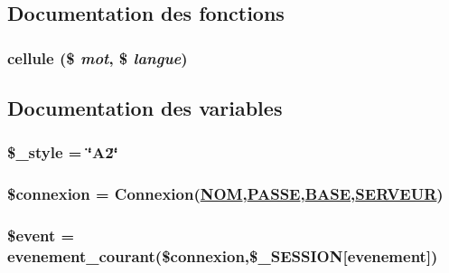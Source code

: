 \subsection{Documentation des fonctions}
\hypertarget{liste__victime_8php_a12}{
\subsubsection[cellule]{\setlength{\rightskip}{0pt plus 5cm}cellule (\$ {\em mot}, \$ {\em langue})}}
\label{liste__victime_8php_a12}




\subsection{Documentation des variables}
\hypertarget{liste__victime_8php_a4}{
\subsubsection[\$\_\-style]{\setlength{\rightskip}{0pt plus 5cm}\$\_\-style = \char`\"{}A2\char`\"{}}}
\label{liste__victime_8php_a4}


\hypertarget{liste__victime_8php_a0}{
\subsubsection[\$connexion]{\setlength{\rightskip}{0pt plus 5cm}\$connexion = Connexion(\hyperlink{pma__connect_8php_a0}{NOM},\hyperlink{pma__connect_8php_a1}{PASSE},\hyperlink{pma__connect_8php_a3}{BASE},\hyperlink{pma__connect_8php_a2}{SERVEUR})}}
\label{liste__victime_8php_a0}


\hypertarget{liste__victime_8php_a1}{
\subsubsection[\$event]{\setlength{\rightskip}{0pt plus 5cm}\$event = evenement\_\-courant(\$connexion,\$\_\-SESSION\mbox{[}evenement\mbox{]})}}
\label{liste__victime_8php_a1}


